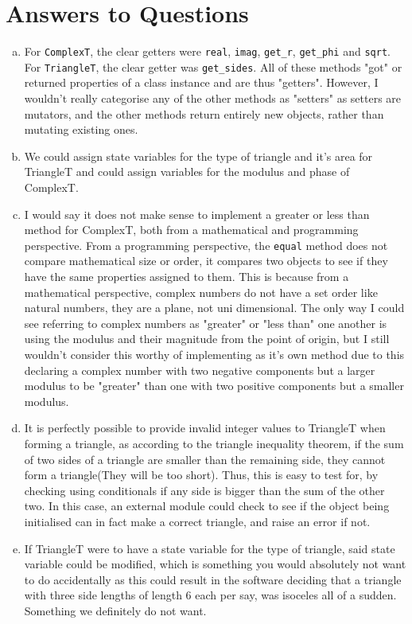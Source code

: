 \documentclass[12pt]{article}
\begin{document}
\section{Answers to Questions}
\begin{enumerate}[(a)]
\item For \verb|ComplexT|, the clear getters were \verb|real|, \verb|imag|, \verb|get_r|, \verb|get_phi| and \verb|sqrt|. For \verb|TriangleT|, the clear getter was \verb|get_sides|. All of these methods "got" or returned properties of a class instance and are thus "getters". However, I wouldn't really categorise any of the other methods as "setters" as setters are mutators, and the other methods return entirely new objects, rather than mutating existing ones.
\item We could assign state variables for the type of triangle and it's area for TriangleT and could assign variables for the modulus and phase of ComplexT.
\item I would say it does not make sense to implement a greater or less than method for ComplexT, both from a mathematical and programming perspective. From a programming perspective, the \verb|equal| method does not compare mathematical size or order, it compares two objects to see if they have the same properties assigned to them. This is because from a mathematical perspective, complex numbers do not have a set order like natural numbers, they are a plane, not uni dimensional. The only way I could see referring to complex numbers as "greater" or "less than" one another is using the modulus and their magnitude from the point of origin, but I still wouldn't consider this worthy of implementing as it's own method due to this declaring a complex number with two negative components but a larger modulus to be "greater" than one with two positive components but a smaller modulus.
\item It is perfectly possible to provide invalid integer values to TriangleT when forming a triangle, as according to the triangle inequality theorem, if the sum of two sides of a triangle are smaller than the remaining side, they cannot form a triangle(They will be too short). Thus, this is easy to test for, by checking using conditionals if any side is bigger than the sum of the other two. In this case, an external module could check to see if the object being initialised can in fact make a correct triangle, and raise an error if not.
\item If TriangleT were to have a state variable for the type of triangle, said state variable could be modified, which is something you would absolutely not want to do accidentally as this could result in the software deciding that a triangle with three side lengths of length 6 each per say, was isoceles all of a sudden. Something we definitely do not want.

\end{enumerate}
\end{document}
